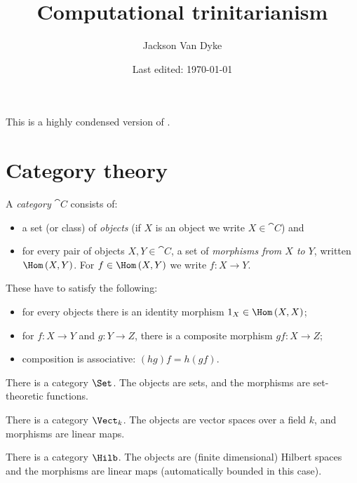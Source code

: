 \documentclass[11pt]{amsart}
\begin{document}
\title{Computational trinitarianism}
\author{Jackson Van Dyke}
\date{Last edited: \today}
\maketitle

This is a highly condensed version of \cite{BS_comp_trin}.

\section{Category theory}

\begin{defn}
A \emph{category} $\cat{C}$ consists of:
\begin{itemize}
\item a set (or class) of \emph{objects} (if $X$ is an object we write $X\in \cat{C}$) and
\item for every pair of objects $X,Y\in \cat{C}$, a set of \emph{morphisms from $X$ to
$Y$}, written $\Hom\left(X , Y\right)$.
For $f\in \Hom\left(X , Y\right)$ we write $f : X\to Y$.
\end{itemize}
These have to satisfy the following:
\begin{itemize}
\item for every objects there is an identity morphism $1_X \in \Hom\left(X , X\right)$;
\item for $f : X\to Y$ and $g : Y\to Z$, there is a
composite morphism $gf : X\to Z$;
\item composition is associative: $\left(hg\right)f = h\left(gf\right)$.
\end{itemize}
\end{defn}

\begin{exm}
There is a category $\Set$. The objects are sets, and the morphisms are set-theoretic
functions.
\end{exm}

\begin{exm}
There is a category $\Vect_k$. The objects are vector spaces over a field $k$, and
morphisms are linear maps.
\end{exm}

\begin{exm}
There is a category $\Hilb$. The objects are (finite dimensional) Hilbert spaces and the
morphisms are linear maps (automatically bounded in this case).
\end{exm}
\end{document}
